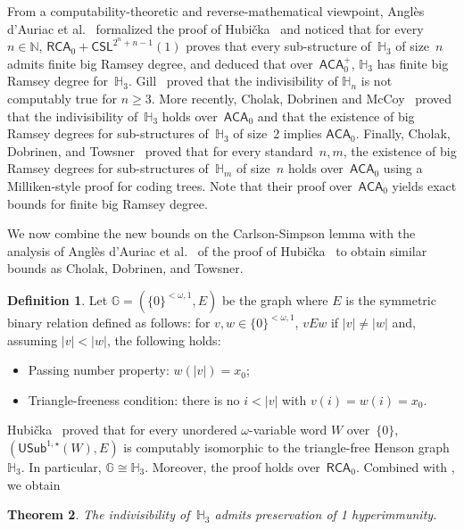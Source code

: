 \documentclass{article}
\def\HH{\mathbb{H}}
\def\GG{\mathbb{G}}
\newcommand{\RCA}[0]{\mathsf{RCA}}
\newcommand{\ACA}[0]{\mathsf{ACA}}
\newcommand{\CSL}[0]{\mathsf{CSL}}
\newcommand{\NN}[0]{\mathbb{N}}
\newcommand{\USub}{\mathsf{USub}}
\newtheorem{theorem}{Theorem}
\numberwithin{theorem}{section}
\theoremstyle{definition}
\newtheorem{definition}[theorem]{Definition}
\begin{document}
From a computability-theoretic and reverse-mathematical viewpoint, Anglès d’Auriac et al.~\cite{angles2023carlson} formalized the proof of Hubi\v{c}ka~\cite{hubivcka2020big} and noticed that for every~$n \in \NN$, $\RCA_0 + \CSL^{2^n+n-1}(1)$ proves that every sub-structure of~$\HH_3$ of size~$n$ admits finite big Ramsey degree, and deduced that over~$\ACA_0^+$, $\HH_3$ has finite big Ramsey degree for~$\HH_3$. Gill~\cite{gill2023note} proved that the indivisibility of $\HH_n$ is not computably true for $n \geq 3$. More recently, Cholak, Dobrinen and McCoy~\cite{cholak2026henson} proved that the indivisibility of~$\HH_3$ holds over~$\ACA_0$ and that the existence of big Ramsey degrees for sub-structures of~$\HH_3$ of size~2 implies $\ACA_0$. Finally, Cholak, Dobrinen, and Towsner~\cite{cholak2026hensonupper} proved that for every standard~$n, m$, the existence of big Ramsey degrees for sub-structures of~$\HH_m$ of size~$n$ holds over~$\ACA_0$ using a Milliken-style proof for coding trees. Note that their proof over~$\ACA_0$ yields exact bounds for finite big Ramsey degree.

We now combine the new bounds on the Carlson-Simpson lemma with the analysis of Anglès d’Auriac et al.~\cite{angles2023carlson} of the proof of Hubi\v{c}ka~\cite{hubivcka2020big} to obtain similar bounds as Cholak, Dobrinen, and Towsner.

\begin{definition}
Let $\GG = (\{0\}^{<\omega, 1}, E)$ be the graph where $E$ is the symmetric binary relation defined as follows:
for $v, w \in \{0\}^{<\omega, 1}$, $v E w$ if $|v| \neq |w|$ and, assuming $|v| < |w|$, the following holds:
\begin{itemize}
    \item[(1)] Passing number property: $w(|v|) = x_0$;
    \item[(2)] Triangle-freeness condition: there is no $i < |v|$ with $v(i) = w(i) = x_0$.
\end{itemize}
\end{definition}

Hubi\v{c}ka~\cite{hubivcka2020big} proved that for every unordered $\omega$-variable word $W$ over~$\{0\}$,
$(\USub^{1,\star}(W), E)$ is computably isomorphic to the triangle-free Henson graph~$\HH_3$. In particular, $\GG \cong \HH_3$. Moreover, the proof holds over~$\RCA_0$. Combined with , we obtain

\begin{theorem}
The indivisibility of~$\HH_3$ admits preservation of 1 hyperimmunity.
\end{theorem}
\end{document}
